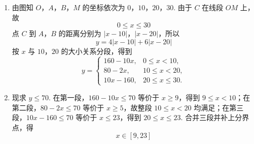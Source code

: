\begin{solution}
\begin{enumerate}
\item 由图知 \(O\)，\(A\)，\(B\)，\(M\) 的坐标依次为 \(0\)，\(10\)，\(20\)，\(30\). 由于 \(C\) 在线段 \(OM\) 上，故
\[
0\leqslant x\leqslant30
\]
点 \(C\) 到 \(A\)，\(B\) 的距离分别为 \(|x-10|\)，\(|x-20|\)，所以
\[
y=4|x-10|+6|x-20|
\]
按 \(x\) 与 \(10\)，\(20\) 的大小关系分段，得到
\[
y=\begin{cases}
160-10x,&0\leqslant x<10,\\
80-2x,&10\leqslant x<20,\\
10x-160,&20\leqslant x\leqslant30.
\end{cases}
\]

\item 现求 \(y\leqslant70\). 在第一段，\(160-10x\leqslant70\) 等价于 \(x\geqslant9\)，得到 \(9\leqslant x<10\)；在第二段，\(80-2x\leqslant70\) 等价于 \(x\geqslant5\)，故整段 \(10\leqslant x<20\) 均满足；在第三段，\(10x-160\leqslant70\) 等价于 \(x\leqslant23\)，得到 \(20\leqslant x\leqslant23\). 合并三段并补上分界点，得
\[
x\in[9,23]
\]
\end{enumerate}
\end{solution}
